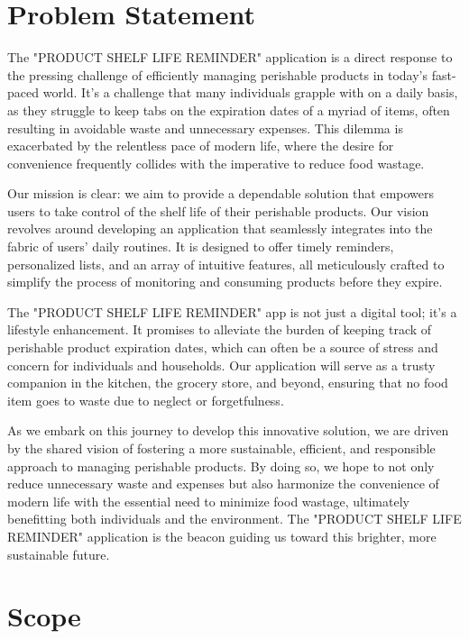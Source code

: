 \section{Problem Statement}

The "PRODUCT SHELF LIFE REMINDER" application is a direct response to the pressing challenge of efficiently managing perishable products in today's fast-paced world. It's a challenge that many individuals grapple with on a daily basis, as they struggle to keep tabs on the expiration dates of a myriad of items, often resulting in avoidable waste and unnecessary expenses. This dilemma is exacerbated by the relentless pace of modern life, where the desire for convenience frequently collides with the imperative to reduce food wastage.

Our mission is clear: we aim to provide a dependable solution that empowers users to take control of the shelf life of their perishable products. Our vision revolves around developing an application that seamlessly integrates into the fabric of users' daily routines. It is designed to offer timely reminders, personalized lists, and an array of intuitive features, all meticulously crafted to simplify the process of monitoring and consuming products before they expire.

The "PRODUCT SHELF LIFE REMINDER" app is not just a digital tool; it's a lifestyle enhancement. It promises to alleviate the burden of keeping track of perishable product expiration dates, which can often be a source of stress and concern for individuals and households. Our application will serve as a trusty companion in the kitchen, the grocery store, and beyond, ensuring that no food item goes to waste due to neglect or forgetfulness.

As we embark on this journey to develop this innovative solution, we are driven by the shared vision of fostering a more sustainable, efficient, and responsible approach to managing perishable products. By doing so, we hope to not only reduce unnecessary waste and expenses but also harmonize the convenience of modern life with the essential need to minimize food wastage, ultimately benefitting both individuals and the environment. The "PRODUCT SHELF LIFE REMINDER" application is the beacon guiding us toward this brighter, more sustainable future.

\section{Scope}

